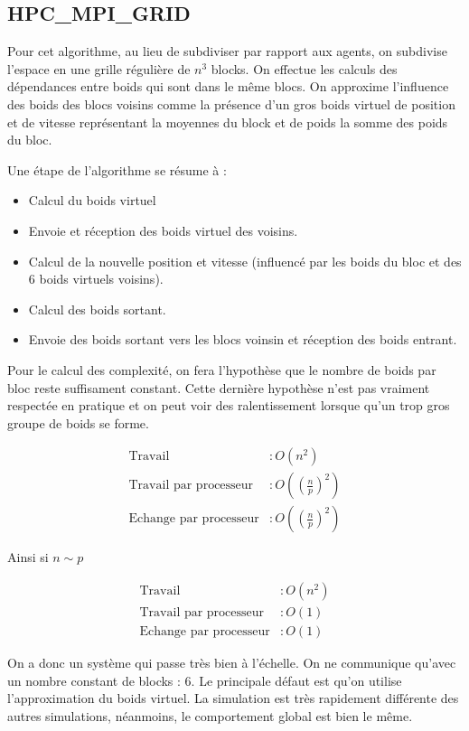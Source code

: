 \documentclass[liens,entete-ensimag,margeCorrection]{ensirapport}
\begin{document}
\subsection{HPC\_MPI\_GRID}

Pour cet algorithme, au lieu de subdiviser par rapport aux agents, on subdivise l'espace en une grille régulière de $n^3$ blocks.
On effectue les calculs des dépendances entre boids qui sont dans le même blocs.
On approxime l'influence des boids des blocs voisins comme la présence d'un gros boids virtuel de position et de vitesse représentant la moyennes du block
et de poids la somme des poids du bloc.

Une étape de l'algorithme se résume à :
\begin{itemize}
    \item Calcul du boids virtuel
    \item Envoie et réception des boids virtuel des voisins.
    \item Calcul de la nouvelle position et vitesse (influencé par les boids du bloc et des 6 boids virtuels voisins).
    \item Calcul des boids sortant.
    \item Envoie des boids sortant vers les blocs voinsin et réception des boids entrant.
\end{itemize}

Pour le calcul des complexité, on fera l'hypothèse que le nombre de boids par bloc reste suffisament constant.
Cette dernière hypothèse n'est pas vraiment respectée en pratique et on peut voir des ralentissement lorsque qu'un trop gros groupe de boids se forme.

\begin{align*}
    \text{Travail} &: O\left( n^2 \right) \\
    \text{Travail par processeur} &: O\left( \left(\frac np \right)^2 \right)  \\
    \text{Echange par processeur} &: O\left( \left(\frac np \right)^2 \right)
\end{align*}

Ainsi si $n \sim p$

\begin{align*}
    \text{Travail} &: O\left( n^2 \right) \\
    \text{Travail par processeur} &: O\left( 1 \right)  \\
    \text{Echange par processeur} &: O\left( 1 \right)
\end{align*}

On a donc un système qui passe très bien à l'échelle. On ne communique qu'avec un nombre constant de blocks : 6.
Le principale défaut est qu'on utilise l'approximation du boids virtuel.
La simulation est très rapidement différente des autres simulations, néanmoins, le comportement global est bien le même.
\end{document}
